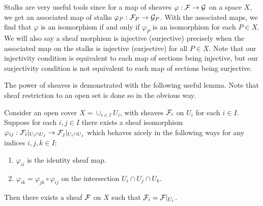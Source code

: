 \documentclass[12pt]{article}
\begin{document}
Stalks are very useful tools since for a map of sheaves $\varphi : \mathcal{F} \to \mathcal{G}$ on a space $X$,
we get an associated map of stalks $\varphi_P : \mathcal{F}_P \to \mathcal{G}_P$.
With the associated maps, we find that $\varphi$ is an isomorphism if and only if $\varphi_P$ is an isomorphism for each $P \in X$.
We will also say a sheaf morphism is injective (surjective) precisely when the associated map on the stalks is injective (surjective) for all $P \in X$.
Note that our injectivity condition is equivalent to each map of sections being injective,
but our surjectivity condition is not equivalent to each map of sections being surjective.

The power of sheaves is demonstrated with the following useful lemma.
Note that sheaf restriction to an open set is done so in the obvious way.

\begin{lemma}
    Consider an open cover $X = \cup_{i \in I} U_i$, with sheaves $\mathcal{F}_i$ on $U_i$ for each $i \in I$.
    Suppose for each $i, j \in I$ there exists a sheaf isomorphism $\varphi_{i j} : \mathcal{F}_i|_{U_i \cap U_j} \to \mathcal{F}_j|_{U_i \cap U_j}$ which behaves nicely in the following ways for any indices $i, j, k \in I$: 
    \begin{enumerate}
        \item $\varphi_{i i}$ is the identity sheaf map.
        \item $\varphi_{i k} = \varphi_{j k} \circ \varphi_{i j}$ on the intersection $U_i \cap U_j \cap U_k$.
    \end{enumerate}
    Then there exists a sheaf $\mathcal{F}$ on $X$ such that $\mathcal{F}_i = \mathcal{F}|_{U_i}$.
\end{lemma}
\end{document}
